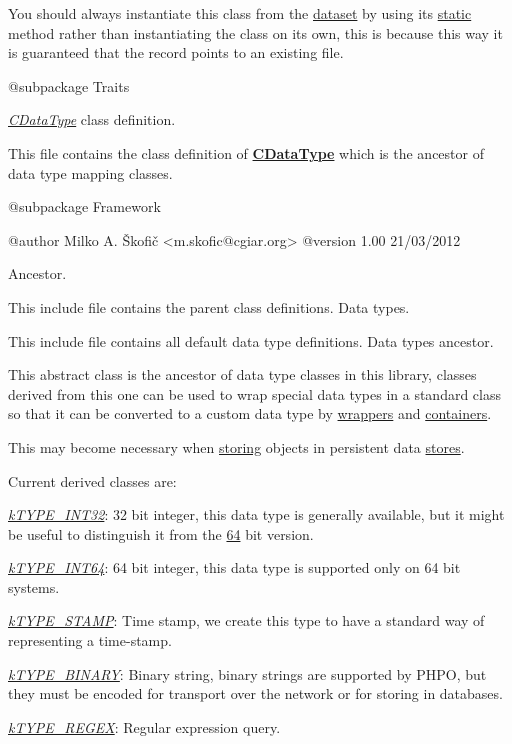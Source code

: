 You should always instantiate this class from the \hyperlink{class_c_dataset}{dataset} by using its \hyperlink{}{static} method rather than instantiating the class on its own, this is because this way it is guaranteed that the record points to an existing file.

\begin{DoxyVerb} @subpackage        Traits\end{DoxyVerb}


{\itshape \hyperlink{class_c_data_type}{C\-Data\-Type}} class definition.

This file contains the class definition of {\bfseries \hyperlink{class_c_data_type}{C\-Data\-Type}} which is the ancestor of data type mapping classes.

\begin{DoxyVerb} @subpackage        Framework

 @author            Milko A. Škofič <m.skofic@cgiar.org>
 @version   1.00 21/03/2012\end{DoxyVerb}


Ancestor.

This include file contains the parent class definitions. Data types.

This include file contains all default data type definitions. Data types ancestor.

This abstract class is the ancestor of data type classes in this library, classes derived from this one can be used to wrap special data types in a standard class so that it can be converted to a custom data type by \hyperlink{class_c_data_wrapper}{wrappers} and \hyperlink{class_c_container}{containers}.

This may become necessary when \hyperlink{class_c_persistent_object_a88b1f2b11d3d60e0b3d33d8b0649b68a}{storing} objects in persistent data \hyperlink{class_c_data_wrapper}{stores}.

Current derived classes are\-:


\begin{DoxyItemize}
\item {\itshape \hyperlink{}{k\-T\-Y\-P\-E\-\_\-\-I\-N\-T32}}\-: 32 bit integer, this data type is generally available, but it might be useful to distinguish it from the \hyperlink{}{64} bit version. 
\item {\itshape \hyperlink{}{k\-T\-Y\-P\-E\-\_\-\-I\-N\-T64}}\-: 64 bit integer, this data type is supported only on 64 bit systems. 
\item {\itshape \hyperlink{}{k\-T\-Y\-P\-E\-\_\-\-S\-T\-A\-M\-P}}\-: Time stamp, we create this type to have a standard way of representing a time-\/stamp. 
\item {\itshape \hyperlink{}{k\-T\-Y\-P\-E\-\_\-\-B\-I\-N\-A\-R\-Y}}\-: Binary string, binary strings are supported by P\-H\-P\-O, but they must be encoded for transport over the network or for storing in databases. 
\item {\itshape \hyperlink{}{k\-T\-Y\-P\-E\-\_\-\-R\-E\-G\-E\-X}}\-: Regular expression query. 
\end{DoxyItemize}


